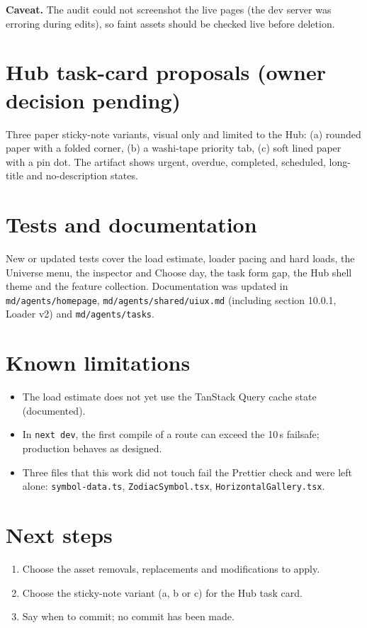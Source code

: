 \documentclass[11pt,a4paper]{article}
\begin{document}
\textbf{Caveat.} The audit could not screenshot the live pages (the dev server was erroring during edits), so faint assets should be checked live before deletion.

\section{Hub task-card proposals (owner decision pending)}
Three paper sticky-note variants, visual only and limited to the Hub: (a) rounded paper with a folded corner, (b) a washi-tape priority tab, (c) soft lined paper with a pin dot. The artifact shows urgent, overdue, completed, scheduled, long-title and no-description states.

\section{Tests and documentation}
New or updated tests cover the load estimate, loader pacing and hard loads, the Universe menu, the inspector and Choose day, the task form gap, the Hub shell theme and the feature collection. Documentation was updated in \texttt{md/agents/homepage}, \texttt{md/agents/shared/uiux.md} (including section 10.0.1, Loader v2) and \texttt{md/agents/tasks}.

\section{Known limitations}
\begin{itemize}
\item The load estimate does not yet use the TanStack Query cache state (documented).
\item In \texttt{next dev}, the first compile of a route can exceed the 10\,s failsafe; production behaves as designed.
\item Three files that this work did not touch fail the Prettier check and were left alone: \texttt{symbol-data.ts}, \texttt{ZodiacSymbol.tsx}, \texttt{HorizontalGallery.tsx}.
\end{itemize}

\section{Next steps}
\begin{enumerate}
\item Choose the asset removals, replacements and modifications to apply.
\item Choose the sticky-note variant (a, b or c) for the Hub task card.
\item Say when to commit; no commit has been made.
\end{enumerate}
\end{document}
